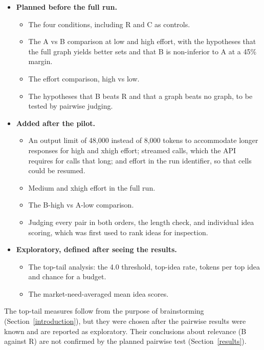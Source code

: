 \begin{itemize}
\tightlist
\item
  \textbf{Planned before the full run.}

  \begin{itemize}
  \tightlist
  \item
    The four conditions, including R and C as controls.
  \item
    The A vs B comparison at low and high effort, with the hypotheses that the full graph yields better sets and that B is non-inferior to A at a 45\% margin.
  \item
    The effort comparison, high vs low.
  \item
    The hypotheses that B beats R and that a graph beats no graph, to be tested by pairwise judging.
  \end{itemize}
\item
  \textbf{Added after the pilot.}

  \begin{itemize}
  \tightlist
  \item
    An output limit of 48,000 instead of 8,000 tokens to accommodate longer responses for high and xhigh effort; streamed calls, which the API requires for calls that long; and effort in the run identifier, so that cells could be resumed.
  \item
    Medium and xhigh effort in the full run.
  \item
    The B-high vs A-low comparison.
  \item
    Judging every pair in both orders, the length check, and individual idea scoring, which was first used to rank ideas for inspection.
  \end{itemize}
\item
  \textbf{Exploratory, defined after seeing the results.}

  \begin{itemize}
  \tightlist
  \item
    The top-tail analysis: the 4.0 threshold, top-idea rate, tokens per top idea and chance for a budget.
  \item
    The market-need-averaged mean idea scores.
  \end{itemize}
\end{itemize}

The top-tail measures follow from the purpose of brainstorming (Section~\ref{introduction}), but they were chosen after the pairwise results were known and are reported as exploratory. Their conclusions about relevance (B against R) are not confirmed by the planned pairwise test (Section~\ref{results}).



